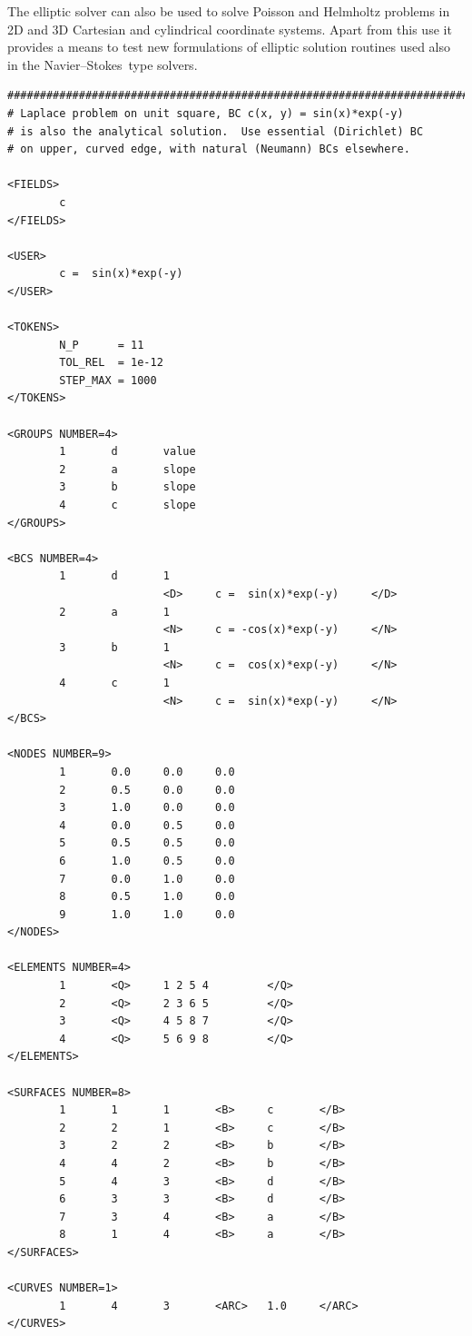 \documentclass[11pt,a4paper]{report}
\newcommand\NavSto{Navier--Stokes}
\begin{document}
The elliptic solver can also be used to solve Poisson and Helmholtz
problems in 2D and 3D Cartesian and cylindrical coordinate systems.
Apart from this use it provides a means to test new formulations of
elliptic solution routines used also in the \NavSto\ type
solvers.

{\small
\begin{verbatim}
##############################################################################
# Laplace problem on unit square, BC c(x, y) = sin(x)*exp(-y)
# is also the analytical solution.  Use essential (Dirichlet) BC
# on upper, curved edge, with natural (Neumann) BCs elsewhere.

<FIELDS>
        c
</FIELDS>

<USER>
        c =  sin(x)*exp(-y)
</USER>

<TOKENS>
        N_P      = 11
        TOL_REL  = 1e-12
        STEP_MAX = 1000
</TOKENS>

<GROUPS NUMBER=4>
        1       d       value
        2       a       slope
        3       b       slope
        4       c       slope
</GROUPS>

<BCS NUMBER=4>
        1       d       1
                        <D>     c =  sin(x)*exp(-y)     </D>
        2       a       1
                        <N>     c = -cos(x)*exp(-y)     </N>
        3       b       1
                        <N>     c =  cos(x)*exp(-y)     </N>
        4       c       1
                        <N>     c =  sin(x)*exp(-y)     </N>
</BCS>

<NODES NUMBER=9>
        1       0.0     0.0     0.0
        2       0.5     0.0     0.0
        3       1.0     0.0     0.0
        4       0.0     0.5     0.0
        5       0.5     0.5     0.0
        6       1.0     0.5     0.0
        7       0.0     1.0     0.0
        8       0.5     1.0     0.0
        9       1.0     1.0     0.0
</NODES>

<ELEMENTS NUMBER=4>
        1       <Q>     1 2 5 4         </Q>
        2       <Q>     2 3 6 5         </Q>
        3       <Q>     4 5 8 7         </Q>
        4       <Q>     5 6 9 8         </Q>
</ELEMENTS>

<SURFACES NUMBER=8>
        1       1       1       <B>     c       </B>
        2       2       1       <B>     c       </B>
        3       2       2       <B>     b       </B>
        4       4       2       <B>     b       </B>
        5       4       3       <B>     d       </B>
        6       3       3       <B>     d       </B>
        7       3       4       <B>     a       </B>
        8       1       4       <B>     a       </B>
</SURFACES>

<CURVES NUMBER=1>
        1       4       3       <ARC>   1.0     </ARC>
</CURVES>
\end{verbatim}
}
\end{document}
